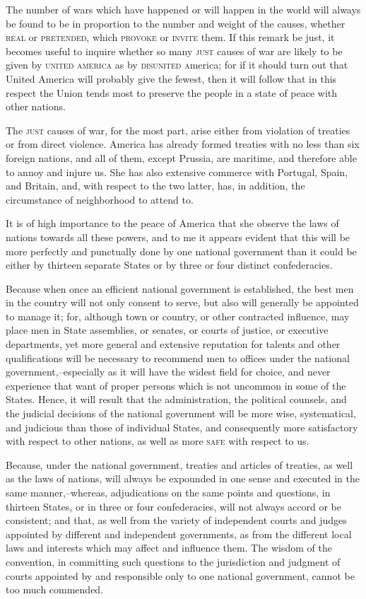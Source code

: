 The number of wars which have happened or will happen in the world will always be found to be in proportion to the number and weight of the causes, whether \textsc{real} or \textsc{pretended}, which \textsc{provoke} or \textsc{invite} them. 
If this remark be just, it becomes useful to inquire whether so many \textsc{just} causes of war are likely to be given by \textsc{united america} as by \textsc{disunited a}merica; for if it should turn out that United America will probably give the fewest, then it will follow that in this respect the Union tends most to preserve the people in a state of peace with other nations.

The \textsc{just} causes of war, for the most part, arise either from violation of treaties or from direct violence. 
America has already formed treaties with no less than six foreign nations, and all of them, except Prussia, are maritime, and therefore able to annoy and injure us. 
She has also extensive commerce with Portugal, Spain, and Britain, and, with respect to the two latter, has, in addition, the circumstance of neighborhood to attend to.

It is of high importance to the peace of America that she observe the laws of nations towards all these powers, and to me it appears evident that this will be more perfectly and punctually done by one national government than it could be either by thirteen separate States or by three or four distinct confederacies.

Because when once an efficient national government is established, the best men in the country will not only consent to serve, but also will generally be appointed to manage it; for, although town or country, or other contracted influence, may place men in State assemblies, or senates, or courts of justice, or executive departments, yet more general and extensive reputation for talents and other qualifications will be necessary to recommend men to offices under the national government,--especially as it will have the widest field for choice, and never experience that want of proper persons which is not uncommon in some of the States. 
Hence, it will result that the administration, the political counsels, and the judicial decisions of the national government will be more wise, systematical, and judicious than those of individual States, and consequently more satisfactory with respect to other nations, as well as more \textsc{safe} with respect to us.

Because, under the national government, treaties and articles of treaties, as well as the laws of nations, will always be expounded in one sense and executed in the same manner,--whereas, adjudications on the same points and questions, in thirteen States, or in three or four confederacies, will not always accord or be consistent; and that, as well from the variety of independent courts and judges appointed by different and independent governments, as from the different local laws and interests which may affect and influence them. 
The wisdom of the convention, in committing such questions to the jurisdiction and judgment of courts appointed by and responsible only to one national government, cannot be too much commended.

